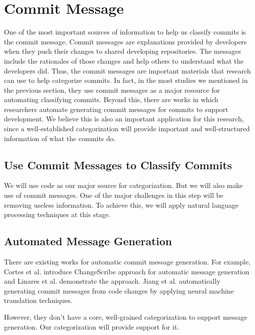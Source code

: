 \section{Commit Message}
\label{sec:message}

One of the most important sources of information to help us classify commits is the commit message.
Commit messages are explanations provided by developers when they push their changes to shared developing repositories.
The messages include the rationales of those changes and help others to understand what the developers did.
Thus, the commit messages are important materials that research can use to help categorize commits. 
In fact, in the most studies we mentioned in the previous section, they use commit messages as a major resource for automating classifying commits.
Beyond this, there are works in which researchers automate generating commit messages for commits to support development.
We believe this is also an important application for this research, since a well-established categorization will provide important and well-structured information of what the commits do.

\subsection{Use Commit Messages to Classify Commits}

We will use code as our major source for categorization. 
But we will also make use of commit messages.
One of the major challenges in this step will be removing useless information.
To achieve this, we will apply natural language processing techniques at this stage.

\subsection{Automated Message Generation}

There are existing works for automatic commit message generation. For example, Cortes et al. \cite{cortes2014automatically} introduce ChangeScribe approach for automatic message generation and Linares et al. \cite{linares2015changescribe} demonstrate the approach.
Jiang et al. \cite{jiang2017automatically } automatically generating commit messages from code changes by applying neural machine translation techniques.

However, they don't have a core, well-grained categorization to support message generation.
Our categorization will provide support for it.


